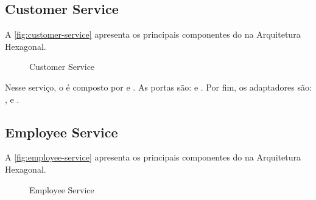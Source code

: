 \subsection{Customer Service}
A \autoref{fig:customer-service} apresenta os principais componentes do  na Arquitetura Hexagonal.

\begin{figure}[H]
    \centering
    \caption{Customer Service}
    \label{fig:customer-service}
\end{figure}

Nesse serviço, o  é composto por   e . As portas são:  e . Por fim, os adaptadores são: ,   e .

\subsection{Employee Service}
A \autoref{fig:employee-service} apresenta os principais componentes do  na Arquitetura Hexagonal.

\begin{figure}[H]
    \centering
    \caption{Employee Service}
    \label{fig:employee-service}
\end{figure}

